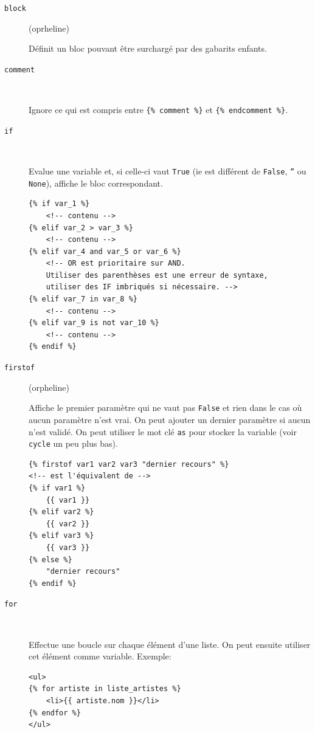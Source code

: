 \documentclass[a4paper, 10pt]{article}
\begin{document}
\begin{description}
	\item[\texttt{block}] (oprheline)

	      Définit un bloc pouvant être surchargé par des gabarits enfants.

	\item[\texttt{comment}]~

	      Ignore ce qui est compris entre \texttt{\{\% comment \%\}} et \texttt{\{\% endcomment \%\}}.

	\item[\texttt{if}]~

	      Evalue une variable et, si celle-ci vaut \texttt{True} (ie est différent de \texttt{False}, \texttt{''} ou \texttt{None}), affiche le bloc correspondant.

	      \begin{verbatim}
{% if var_1 %}
    <!-- contenu -->
{% elif var_2 > var_3 %}
    <!-- contenu -->
{% elif var_4 and var_5 or var_6 %}
    <!-- OR est prioritaire sur AND.
    Utiliser des parenthèses est une erreur de syntaxe,
    utiliser des IF imbriqués si nécessaire. -->
{% elif var_7 in var_8 %}
    <!-- contenu -->
{% elif var_9 is not var_10 %}
    <!-- contenu -->
{% endif %}
    \end{verbatim}

	\item[\texttt{firstof}] (orpheline)

	      Affiche le premier paramètre qui ne vaut pas \texttt{False} et rien dans le cas où aucun paramètre n'est vrai. On peut ajouter un dernier paramètre si aucun n'est validé. On peut utiliser le mot clé \texttt{as} pour stocker la variable (voir \texttt{cycle} un peu plus bas).

	      \begin{verbatim}
{% firstof var1 var2 var3 "dernier recours" %}
<!-- est l'équivalent de -->
{% if var1 %}
    {{ var1 }}
{% elif var2 %}
    {{ var2 }}
{% elif var3 %}
    {{ var3 }}
{% else %}
    "dernier recours"
{% endif %}
    \end{verbatim}

	\item[\texttt{for}]~

	      Effectue une boucle sur chaque élément d'une liste. On peut ensuite utiliser cet élément comme variable. Exemple:
	      \begin{verbatim}
<ul>
{% for artiste in liste_artistes %}
    <li>{{ artiste.nom }}</li>
{% endfor %}
</ul>
    \end{verbatim}


\end{description}
\end{document}
